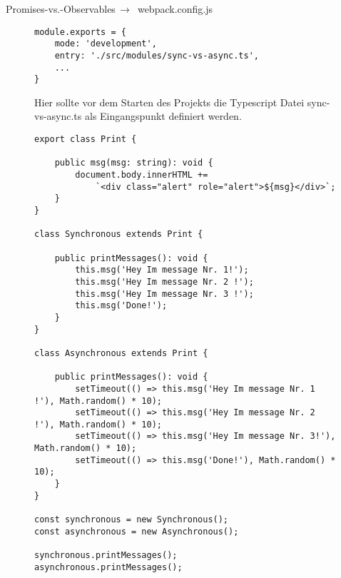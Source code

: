 \begin{center}
    Promises-vs.-Observables$\,\to\,$ webpack.config.js
\end{center}

\begin{figure}[H]
\begin{lstlisting}
module.exports = {
    mode: 'development',
    entry: './src/modules/sync-vs-async.ts',
    ...
}
\end{lstlisting}
\caption{Hier sollte vor dem Starten des Projekts die Typescript Datei sync-vs-async.ts als Eingangspunkt definiert werden.}
\end{figure}

\begin{figure}[H]
\begin{lstlisting}
export class Print {

    public msg(msg: string): void {
        document.body.innerHTML +=
            `<div class="alert" role="alert">${msg}</div>`;
    }
}

class Synchronous extends Print {

    public printMessages(): void {
        this.msg('Hey Im message Nr. 1!');
        this.msg('Hey Im message Nr. 2 !');
        this.msg('Hey Im message Nr. 3 !');
        this.msg('Done!');
    }
}

class Asynchronous extends Print {

    public printMessages(): void {
        setTimeout(() => this.msg('Hey Im message Nr. 1 !'), Math.random() * 10);
        setTimeout(() => this.msg('Hey Im message Nr. 2 !'), Math.random() * 10);
        setTimeout(() => this.msg('Hey Im message Nr. 3!'), Math.random() * 10);
        setTimeout(() => this.msg('Done!'), Math.random() * 10);
    }
}

const synchronous = new Synchronous();
const asynchronous = new Asynchronous();

synchronous.printMessages();
asynchronous.printMessages();
\end{lstlisting}
\end{figure}


